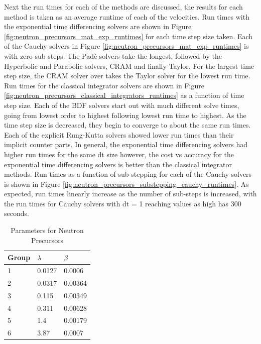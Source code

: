 Next the run times for each of the methods are discussed, the results for each method is taken as an average runtime of each of the velocities. Run times with the exponential time differencing solvers are shown in Figure \ref{fig:neutron_precursors_mat_exp_runtimes} for each time step size taken. Each of the Cauchy solvers in Figure \ref{fig:neutron_precursors_mat_exp_runtimes} is with zero sub-steps. The Pad\'e solvers take the longest, followed by the Hyperbolic and Parabolic solvers, CRAM and finally Taylor. For the largest time step size, the CRAM solver over takes the Taylor solver for the lowest run time. Run times for the classical integrator solvers are shown in Figure \ref{fig:neutron_precursors_classical_integrators_runtimes} as a function of time step size. Each of the BDF solvers start out with much different solve times, going from lowest order to highest following lowest run time to highest. As the time step size is decreased, they begin to converge to about the same run times. Each of the explicit Rung-Kutta solvers showed lower run times than their implicit counter parts. In general, the exponential time differencing solvers had higher run times for the same dt size however, the cost vs accuracy for the exponential time differencing solvers is better than the classical integrator methods. Run times as a function of sub-stepping for each of the Cauchy solvers is shown in Figure \ref{fig:neutron_precursors_substepping_cauchy_runtimes}. As expected, run times linearly increase as the number of sub-steps is increased, with the run times for Cauchy solvers with dt = 1 reaching values as high has 300 seconds. 



\clearpage

\begin{table}[p]
   \caption{\label{tab:precursorCoeffs} Parameters for Neutron Precursors}
   \centering
   \begin{tabular}{lll}
   \hline
   Group & $\lambda$ & $\beta$ \\
   \hline
   1 & 0.0127 & 0.0006 \\
   2 & 0.0317 & 0.00364 \\
   3 & 0.115 & 0.00349 \\
   4 & 0.311& 0.00628 \\
   5 & 1.4 & 0.00179\\
   6 & 3.87 & 0.0007 \\
   \hline
   \end{tabular}
\end{table} 

